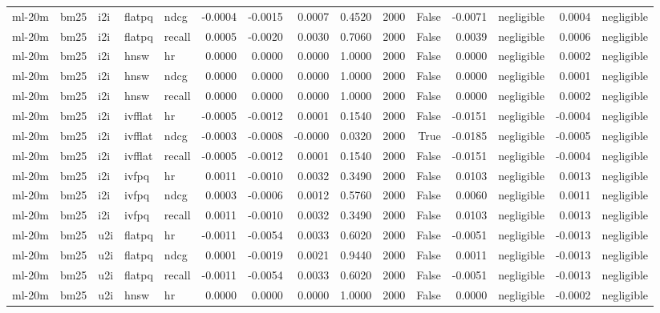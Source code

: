 \begin{tabular}{lllllrrrrrrrlrl}
ml-20m & bm25 & i2i & flatpq & ndcg & -0.0004 & -0.0015 & 0.0007 & 0.4520 & 2000 & False & -0.0071 & negligible & 0.0004 & negligible \\
ml-20m & bm25 & i2i & flatpq & recall & 0.0005 & -0.0020 & 0.0030 & 0.7060 & 2000 & False & 0.0039 & negligible & 0.0006 & negligible \\
ml-20m & bm25 & i2i & hnsw & hr & 0.0000 & 0.0000 & 0.0000 & 1.0000 & 2000 & False & 0.0000 & negligible & 0.0002 & negligible \\
ml-20m & bm25 & i2i & hnsw & ndcg & 0.0000 & 0.0000 & 0.0000 & 1.0000 & 2000 & False & 0.0000 & negligible & 0.0001 & negligible \\
ml-20m & bm25 & i2i & hnsw & recall & 0.0000 & 0.0000 & 0.0000 & 1.0000 & 2000 & False & 0.0000 & negligible & 0.0002 & negligible \\
ml-20m & bm25 & i2i & ivfflat & hr & -0.0005 & -0.0012 & 0.0001 & 0.1540 & 2000 & False & -0.0151 & negligible & -0.0004 & negligible \\
ml-20m & bm25 & i2i & ivfflat & ndcg & -0.0003 & -0.0008 & -0.0000 & 0.0320 & 2000 & True & -0.0185 & negligible & -0.0005 & negligible \\
ml-20m & bm25 & i2i & ivfflat & recall & -0.0005 & -0.0012 & 0.0001 & 0.1540 & 2000 & False & -0.0151 & negligible & -0.0004 & negligible \\
ml-20m & bm25 & i2i & ivfpq & hr & 0.0011 & -0.0010 & 0.0032 & 0.3490 & 2000 & False & 0.0103 & negligible & 0.0013 & negligible \\
ml-20m & bm25 & i2i & ivfpq & ndcg & 0.0003 & -0.0006 & 0.0012 & 0.5760 & 2000 & False & 0.0060 & negligible & 0.0011 & negligible \\
ml-20m & bm25 & i2i & ivfpq & recall & 0.0011 & -0.0010 & 0.0032 & 0.3490 & 2000 & False & 0.0103 & negligible & 0.0013 & negligible \\
ml-20m & bm25 & u2i & flatpq & hr & -0.0011 & -0.0054 & 0.0033 & 0.6020 & 2000 & False & -0.0051 & negligible & -0.0013 & negligible \\
ml-20m & bm25 & u2i & flatpq & ndcg & 0.0001 & -0.0019 & 0.0021 & 0.9440 & 2000 & False & 0.0011 & negligible & -0.0013 & negligible \\
ml-20m & bm25 & u2i & flatpq & recall & -0.0011 & -0.0054 & 0.0033 & 0.6020 & 2000 & False & -0.0051 & negligible & -0.0013 & negligible \\
ml-20m & bm25 & u2i & hnsw & hr & 0.0000 & 0.0000 & 0.0000 & 1.0000 & 2000 & False & 0.0000 & negligible & -0.0002 & negligible \\

\end{tabular}
